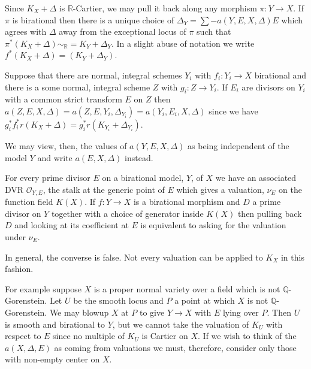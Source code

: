 
Since $K_{X}+\Delta$ is $\mathbb{R}$-Cartier, we may pull it back along any morphism $\pi\colon  Y \to X$. If $\pi$ is birational then there is a unique choice of $\Delta_{Y}=\sum -a(Y,E,X,\Delta)E$ which agrees with $\Delta$ away from the exceptional locus of $\pi$ such that $\pi^{*}(K_{X}+\Delta)\sim_{\mathbb{R}}=K_{Y}+\Delta_{Y}$. In a slight abuse of notation we write $f^{*}(K_{X}+\Delta)=(K_{Y}+ \Delta_{Y})$.

Suppose that there are normal, integral schemes $Y_{i}$ with $f_{i}:Y_{i} \to X$ birational and there is a some normal, integral scheme $Z$ with $g_{i}:Z\to Y_{i}$. If $E_{i}$ are divisors on $Y_{i}$ with a common strict transform $E$ on $Z$ then $a(Z,E,X,\Delta)=a(Z,E,Y_{i},\Delta_{Y_{i}})=a(Y_{i},E_{i},X,\Delta)$ since we have $g_{i}^{*}f_{i}^{*}r(K_{X}+\Delta)=g_{i}^{*}r(K_{Y_{i}}+\Delta_{Y_{i}})$.

We may view, then, the values of $a(Y,E,X,\Delta)$ as being independent of the model $Y$ and write $a(E,X,\Delta)$ instead. 

For every prime divisor $E$ on a birational model, $Y$, of $X$ we have an associated DVR $\mathcal{O}_{Y,E}$, the stalk at the generic point of $E$ which gives a valuation, $\nu_{E}$ on the function field $K(X)$. If $f\colon Y \to X$ is a birational morphism and $D$ a prime divisor on $Y$ together with a choice of generator inside $K(X)$ then pulling back $D$ and looking at its coefficient at $E$ is equivalent to asking for the valuation under $\nu_{E}$. 

In general, the converse is false. Not every valuation can be applied to $K_{X}$ in this fashion.

For example suppose $X$ is a proper normal variety over a field which is not $\mathbb{Q}$-Gorenstein. Let $U$ be the smooth locus and $P$ a point at which $X$ is not $\mathbb{Q}$-Gorenstein. We may blowup $X$ at $P$ to give $Y \to X$ with $E$ lying over $P$. Then $U$ is smooth and birational to $Y$, but we cannot take the valuation of $K_{U}$ with respect to $E$ since no multiple of $K_{U}$ is Cartier on $X$. If we wish to think of the $a(X,\Delta,E)$ as coming from valuations we must, therefore, consider only those with non-empty center on $X$. 

